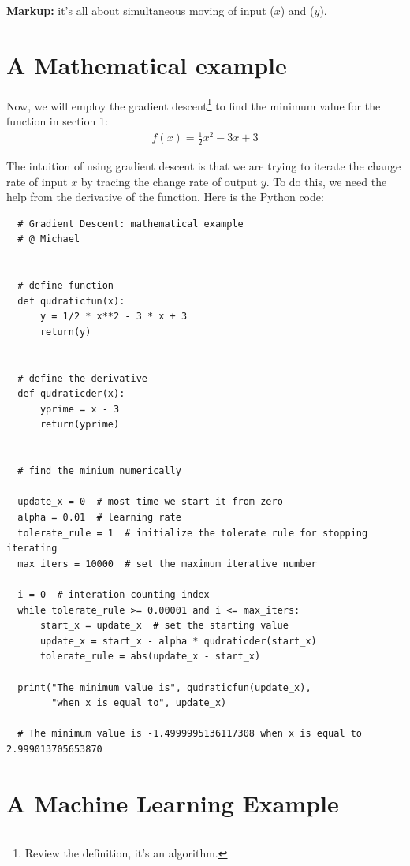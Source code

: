 \documentclass[12pt]{article}
\theoremstyle{definition}
\numberwithin{equation}{section}
\numberwithin{figure}{section}
\numberwithin{table}{section}
\begin{document}
\textbf{Markup:} it's all about simultaneous moving of input ($x$) and ($y$).

\section{A Mathematical example}

Now, we will employ the gradient descent\footnote{Review the definition, it's an algorithm.} to find the minimum value for the function in section 1:
\begin{align*}
  f(x) = \frac{1}{2} x^2 - 3x + 3
\end{align*}

The intuition of using gradient descent is that we are trying to iterate the change rate of input $x$ by tracing the change rate of output $y$. To do this, we need the help from the derivative of the function. Here is the Python code:
\begin{lstlisting}
  # Gradient Descent: mathematical example
  # @ Michael


  # define function
  def qudraticfun(x):
      y = 1/2 * x**2 - 3 * x + 3
      return(y)


  # define the derivative
  def qudraticder(x):
      yprime = x - 3
      return(yprime)


  # find the minium numerically

  update_x = 0  # most time we start it from zero
  alpha = 0.01  # learning rate
  tolerate_rule = 1  # initialize the tolerate rule for stopping iterating
  max_iters = 10000  # set the maximum iterative number

  i = 0  # interation counting index
  while tolerate_rule >= 0.00001 and i <= max_iters:
      start_x = update_x  # set the starting value
      update_x = start_x - alpha * qudraticder(start_x)
      tolerate_rule = abs(update_x - start_x)

  print("The minimum value is", qudraticfun(update_x),
        "when x is equal to", update_x)

  # The minimum value is -1.4999995136117308 when x is equal to 2.999013705653870
\end{lstlisting}

\section{A Machine Learning Example}

























\newpage


\end{document}
